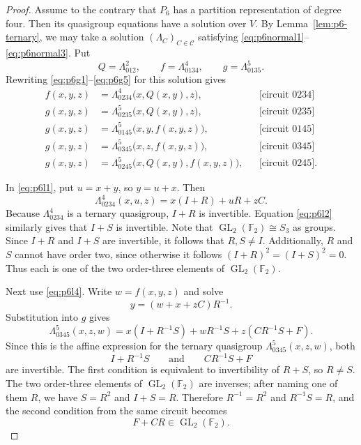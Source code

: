\documentclass[10pt,a4paper]{amsart}
\newcommand{\F}{\mathbb F}
\newcommand{\GL}{\operatorname{GL}}
\newcommand{\circuittag}[1]{\text{[circuit $#1$]}}
\begin{document}
\begin{proof}
Assume to the contrary that $P_6$ has a partition representation of degree
four. Then its quasigroup equations have a solution over $V$. By
Lemma~\ref{lem:p6-ternary}, we may take a solution
$(\Lambda_C)_{C\in\mathcal C}$ satisfying
\eqref{eq:p6normal1}--\eqref{eq:p6normal3}. Put
\[
Q=\Lambda_{012}^{2},\qquad
f=\Lambda_{0134}^{4},\qquad
g=\Lambda_{0135}^{5}.
\]
Rewriting \eqref{eq:p6g1}--\eqref{eq:p6g5} for this solution gives
\begin{align}
f(x,y,z)&=\Lambda_{0234}^{4}\bigl(x,Q(x,y),z\bigr),
&&\circuittag{0234}\label{eq:p6l1}\\
g(x,y,z)&=\Lambda_{0235}^{5}\bigl(x,Q(x,y),z\bigr),
&&\circuittag{0235}\label{eq:p6l2}\\
g(x,y,z)&=\Lambda_{0145}^{5}\bigl(x,y,f(x,y,z)\bigr),
&&\circuittag{0145}\label{eq:p6l3}\\
g(x,y,z)&=\Lambda_{0345}^{5}\bigl(x,z,f(x,y,z)\bigr),
&&\circuittag{0345}\label{eq:p6l4}\\
g(x,y,z)&=\Lambda_{0245}^{5}\bigl(x,Q(x,y),f(x,y,z)\bigr),
&&\circuittag{0245}.\label{eq:p6l5}
\end{align}

In \eqref{eq:p6l1}, put $u=x+y$, so $y=u+x$. Then
\[
\Lambda_{0234}^{4}(x,u,z)=x(I+R)+uR+zC.
\]
Because $\Lambda_{0234}^{4}$ is a ternary quasigroup, $I+R$ is invertible.
Equation \eqref{eq:p6l2} similarly gives that $I+S$ is invertible. Note that 
$\GL_2(\F_2) \cong S_3$ as groups. Since $I+R$ and $I+S$ are invertible, it follows
that $R,S \neq I$. Additionally, $R$ and $S$ cannot have order two, since otherwise it follows $(I+R)^2 = (I+S)^2 = 0$.
Thus each is one of the two order-three elements of $\GL_2(\F_2)$.

Next use \eqref{eq:p6l4}. Write $w=f(x,y,z)$ and solve
\[
y=(w+x+zC)R^{-1}.
\]
Substitution into $g$ gives
\[
\Lambda_{0345}^5(x,z,w)=x(I+R^{-1}S)+wR^{-1}S+z(CR^{-1}S+F).
\]
Since this is the affine expression for the ternary quasigroup
$\Lambda_{0345}^{5}(x,z,w)$, both
\[
I+R^{-1}S\qquad\text{and}\qquad CR^{-1}S+F
\]
are invertible. The first condition is equivalent to invertibility of $R+S$,
so $R\ne S$. The two order-three elements of $\GL_2(\F_2)$ are inverses;
after naming one of them $R$, we have $S=R^2$ and $I + S = R$. Therefore
$R^{-1}=R^2$ and $R^{-1}S=R$, and the second condition from the same circuit
becomes
\begin{equation}\label{eq:p6condCR}
F+CR\in\GL_2(\F_2).
\end{equation}


\end{proof}
\end{document}
